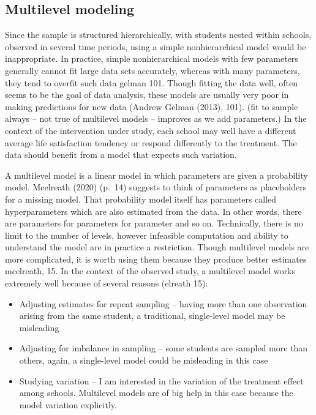 \documentclass[a4, 12pt]{article}
\begin{document}
\hypertarget{multilevel-modeling}{%
\subsection{Multilevel modeling}\label{multilevel-modeling}}

Since the sample is structured hierarchically, with students nested within schools, observed in several time periods, using a simple nonhierarchical model would be inappropriate. In practice, simple nonhierarchical models with few parameters generally cannot fit large data sets accurately, whereas with many parameters, they tend to overfit such data gelman 101. Though fitting the data well, often seems to be the goal of data analysis, these models are usually very poor in making predictions for new data (Andrew Gelman (2013), 101). (fit to sample always -- not true of multilevel models -- improves as we add parameters.) In the context of the intervention under study, each school may well have a different average life satisfaction tendency or respond differently to the treatment. The data should benefit from a model that expects such variation.

A multilevel model is a linear model in which parameters are given a probability model. Mcelreath (2020) (p.~14) suggests to think of parameters as placeholders for a missing model. That probability model itself has parameters called hyperparameters which are also estimated from the data. In other words, there are parameters for parameters for parameter and so on. Technically, there is no limit to the number of levels, however infeasible computation and ability to understand the model are in practice a restriction. Though multilevel models are more complicated, it is worth using them because they produce better estimates mcelreath, 15. In the context of the observed study, a multilevel model works extremely well because of several reasons (elreath 15):

\begin{itemize}
\item Adjusting estimates for repeat sampling -- having more than one observation arising from the same student, a traditional, single-level model may be misleading
\item Adjusting for imbalance in sampling -- some students are sampled more than others, again, a single-level model could be misleading in this case
\item Studying variation -- I am interested in the variation of the treatment effect among schools. Multilevel models are of big help in this case because the model variation explicitly.
\end{itemize}
\end{document}
